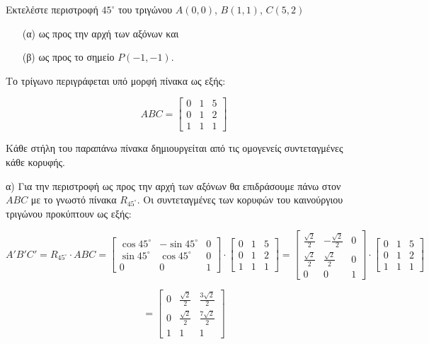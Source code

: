 \begin{example}
Εκτελέστε περιστροφή $45^\circ$ του τριγώνου $A(0, 0)$, $B(1, 1)$, $C(5, 2)$ 
\begin{enumerate}
    \item[(α)] ως προς την αρχή των αξόνων και 
    \item[(β)] ως προς το σημείο $P(-1, -1)$.
\end{enumerate}
\end{example}


\begin{solution}
Το τρίγωνο περιγράφεται υπό μορφή πίνακα ως εξής:


\[
ABC =
\begin{bmatrix}
0 & 1 & 5 \\
0 & 1 & 2 \\
1 & 1 & 1
\end{bmatrix}
\]

Κάθε στήλη του παραπάνω πίνακα δημιουργείται από τις ομογενείς συντεταγμένες κάθε κορυφής.

α) Για την περιστροφή ως προς την αρχή των αξόνων θα επιδράσουμε πάνω στον $ABC$ με το γνωστό πίνακα $R_{45^\circ}$. Οι συντεταγμένες των κορυφών του καινούργιου τριγώνου προκύπτουν ως εξής:

\[
A'B'C' = R_{45^\circ} \cdot ABC =
\begin{bmatrix}
\cos 45^\circ & -\sin 45^\circ & 0 \\
\sin 45^\circ & \cos 45^\circ & 0 \\
0 & 0 & 1
\end{bmatrix}
\cdot
\begin{bmatrix}
0 & 1 & 5 \\
0 & 1 & 2 \\
1 & 1 & 1
\end{bmatrix}
=
\begin{bmatrix}
\frac{\sqrt{2}}{2} & -\frac{\sqrt{2}}{2} & 0 \\
\frac{\sqrt{2}}{2} & \frac{\sqrt{2}}{2} & 0 \\
0 & 0 & 1
\end{bmatrix}
\cdot
\begin{bmatrix}
0 & 1 & 5 \\
0 & 1 & 2 \\
1 & 1 & 1
\end{bmatrix}
\]

\[
=
\begin{bmatrix}
0 & \frac{\sqrt{2}}{2} & \frac{3\sqrt{2}}{2} \\
0 & \frac{\sqrt{2}}{2} & \frac{7\sqrt{2}}{2} \\
1 & 1 & 1
\end{bmatrix}
\]


\end{solution}
